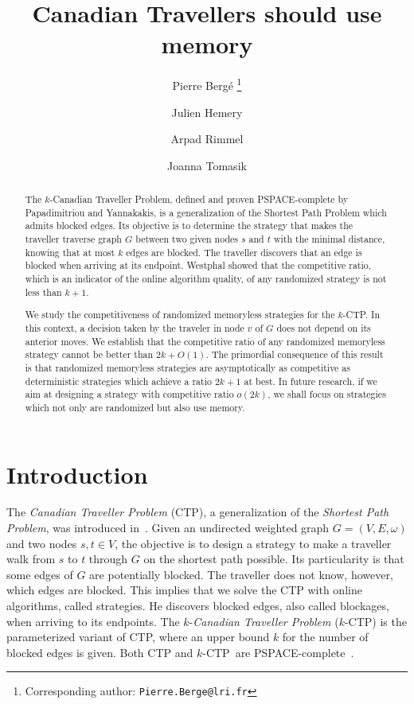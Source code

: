 \documentclass[11pt,letterpaper]{article}
\title{Canadian Travellers should use memory}
\date{}
\author[,1]{Pierre Berg\'e \thanks{Corresponding author: \texttt{Pierre.Berge@lri.fr}}}
\author[2]{Julien Hemery}
\author[2]{Arpad Rimmel}
\author[2]{Joanna Tomasik}
\affil[1]{LRI, Universit\'e Paris-Sud, Universit\'e{} Paris-Saclay, 91405 Orsay Cedex, France}
\affil[2]{LRI, CentraleSup\' elec, Universit\'e{} Paris-Saclay, 91405 Orsay Cedex, France}
\newcommand{\kctp}{$k$-CTP}
\begin{document}


\maketitle

\begin{abstract}
 
The $k$-Canadian Traveller Problem, defined and proven PSPACE-complete by Papadimitriou and Yannakakis, is a generalization of the Shortest Path Problem which admits blocked edges. Its objective is to determine the strategy that makes the traveller traverse graph $G$ between two given nodes $s$ and $t$ with the minimal distance, knowing that at most $k$ edges are blocked. The traveller discovers that an edge is blocked when arriving at its endpoint. Westphal showed that the competitive ratio, which is an indicator of the online algorithm quality, of any randomized strategy is not less than $k+1$. 
 
We study the competitiveness of randomized memoryless strategies for the \kctp . In this context, a decision taken by the traveler in node $v$ of $G$ does not depend on its anterior moves. We establish that the competitive ratio of any randomized memoryless strategy cannot be better than $2k + O\left(1\right)$. The primordial consequence of this result is that randomized memoryless strategies are asymptotically as competitive as deterministic strategies which achieve a ratio $2k+1$ at best. In future research, if we aim at designing a strategy with competitive ratio $o\left(2k\right)$, we shall focus on strategies which not only are randomized but also use memory.
\end{abstract}

\section{Introduction}

The \textit{Canadian Traveller Problem} (CTP), a generalization of the \textit{Shortest Path Problem}, was introduced in~\cite{PaYa91}. Given an undirected weighted graph $G=(V,E,\omega)$ and two nodes $s,t \in V$, the objective is to design a strategy to make a traveller walk from $s$ to $t$ through $G$ on the shortest path possible. Its particularity is that some edges of $G$ are potentially blocked. The traveller does not know, however, which edges are blocked. This implies that we solve the CTP with online algorithms, called strategies. He discovers blocked edges, also called blockages, when arriving to its endpoints. The $k$-\textit{Canadian Traveller Problem} (\kctp) is the parameterized variant of CTP, where an upper bound $k$ for the number of blocked edges is given. Both CTP and \kctp ~are PSPACE-complete~\cite{BaSc91,PaYa91}.
\end{document}
